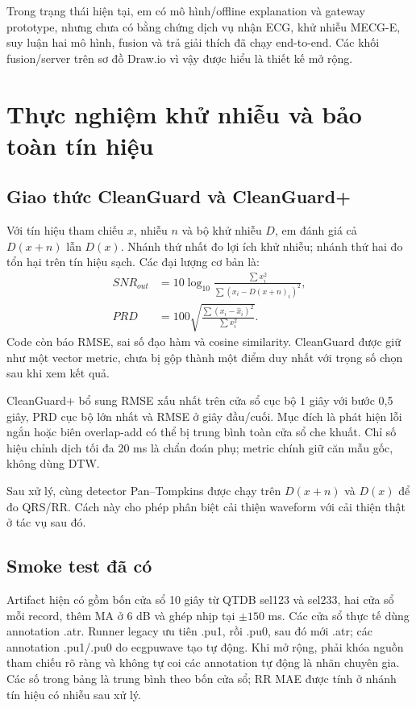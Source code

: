 \documentclass[12pt,a4paper,oneside]{report}
\begin{document}
Trong trạng thái hiện tại, em có mô hình/offline explanation và gateway prototype, nhưng chưa có bằng chứng dịch vụ nhận ECG, khử nhiễu MECG-E, suy luận hai mô hình, fusion và trả giải thích đã chạy end-to-end. Các khối fusion/server trên sơ đồ Draw.io vì vậy được hiểu là thiết kế mở rộng.

\chapter{Thực nghiệm khử nhiễu và bảo toàn tín hiệu}
\section{Giao thức CleanGuard và CleanGuard+}
Với tín hiệu tham chiếu $x$, nhiễu $n$ và bộ khử nhiễu $D$, em đánh giá cả $D(x+n)$ lẫn $D(x)$. Nhánh thứ nhất đo lợi ích khử nhiễu; nhánh thứ hai đo tổn hại trên tín hiệu sạch. Các đại lượng cơ bản là:
\begin{align}
SNR_{out}&=10\log_{10}\frac{\sum x_i^2}{\sum(x_i-D(x+n)_i)^2},\\
PRD&=100\sqrt{\frac{\sum(x_i-\widehat{x}_i)^2}{\sum x_i^2}}.
\end{align}
Code còn báo RMSE, sai số đạo hàm và cosine similarity. CleanGuard được giữ như một vector metric, chưa bị gộp thành một điểm duy nhất với trọng số chọn sau khi xem kết quả.

CleanGuard+ bổ sung RMSE xấu nhất trên cửa sổ cục bộ 1 giây với bước 0,5 giây, PRD cục bộ lớn nhất và RMSE ở giây đầu/cuối. Mục đích là phát hiện lỗi ngắn hoặc biên overlap-add có thể bị trung bình toàn cửa sổ che khuất. Chỉ số hiệu chỉnh dịch tối đa 20 ms là chẩn đoán phụ; metric chính giữ căn mẫu gốc, không dùng DTW.

Sau xử lý, cùng detector Pan--Tompkins được chạy trên $D(x+n)$ và $D(x)$ để đo QRS/RR. Cách này cho phép phân biệt cải thiện waveform với cải thiện thật ở tác vụ sau đó.

\section{Smoke test đã có}
Artifact hiện có gồm bốn cửa sổ 10 giây từ QTDB sel123 và sel233, hai cửa sổ mỗi record, thêm MA ở 6 dB và ghép nhịp tại $\pm150$ ms. Các cửa sổ thực tế dùng annotation .atr. Runner legacy ưu tiên .pu1, rồi .pu0, sau đó mới .atr; các annotation .pu1/.pu0 do ecgpuwave tạo tự động. Khi mở rộng, phải khóa nguồn tham chiếu rõ ràng và không tự coi các annotation tự động là nhãn chuyên gia. Các số trong bảng là trung bình theo bốn cửa sổ; RR MAE được tính ở nhánh tín hiệu có nhiễu sau xử lý.
\end{document}
